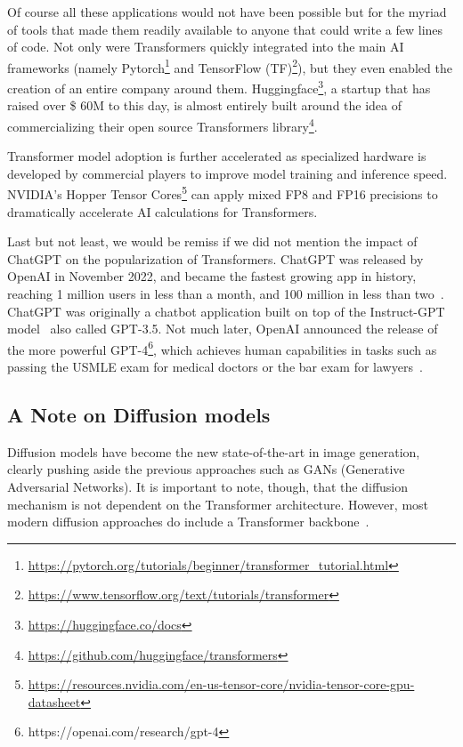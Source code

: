 \documentclass{article}
\begin{document}
Of course all these applications would not have been possible but for the myriad of tools that made them readily available to anyone that could write a few lines of code. Not only were Transformers quickly integrated into the main AI frameworks (namely Pytorch\footnote{\url{https://pytorch.org/tutorials/beginner/transformer_tutorial.html}} and TensorFlow (TF)\footnote{\url{https://www.tensorflow.org/text/tutorials/transformer}}), but they even enabled the creation of an entire company around them. Huggingface\footnote{\url{https://huggingface.co/docs}}, a startup that has raised over \$ 60M to this day, is almost entirely built around the idea of commercializing their open source Transformers library\footnote{\url{https://github.com/huggingface/transformers}}. 

Transformer model adoption is further accelerated as specialized hardware is developed by commercial players to improve model training and inference speed. NVIDIA's Hopper Tensor Cores\footnote{\url{https://resources.nvidia.com/en-us-tensor-core/nvidia-tensor-core-gpu-datasheet}} can apply mixed FP8 and FP16 precisions to dramatically accelerate AI calculations for Transformers.

Last but not least, we would be remiss if we did not mention the impact of ChatGPT on the popularization of Transformers. ChatGPT was released by OpenAI in November 2022, and became the fastest growing app in history, reaching 1 million users in less than a month, and 100 million in less than two~. ChatGPT was originally a chatbot application built on top of the Instruct-GPT model~ also called GPT-3.5. Not much later, OpenAI announced the release of the more powerful GPT-4\footnote{https://openai.com/research/gpt-4}, which achieves human capabilities in tasks such as passing the USMLE exam for medical doctors or the bar exam for lawyers~.

\subsection{A Note on Diffusion models}

Diffusion models have become the new state-of-the-art in image generation, clearly pushing aside the previous approaches such as GANs (Generative Adversarial Networks). It is important to note, though, that the diffusion mechanism is not dependent on the Transformer architecture. However, most modern diffusion approaches do include a Transformer backbone~.
\end{document}
